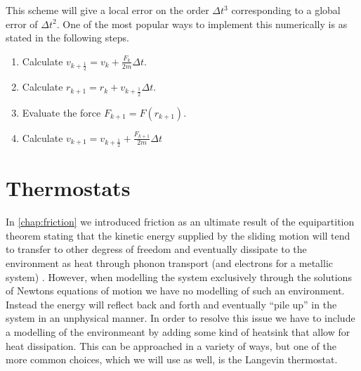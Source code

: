This scheme will give a local error on the order $\Delta t^3$ corresponding to a
global error of $\Delta t^2$. One of the most popular ways to implement this
numerically is as stated in the following steps.
\begin{enumerate}
  \centering
  \item Calculate $v_{k+\frac{1}{2}} = v_k + \frac{F_k}{2m} \Delta t$.
  \item Calculate $r_{k+1} = r_k + v_{k+\frac{1}{2}} \Delta t$.
  \item Evaluate the force $F_{k+1} = F(r_{k+1})$.
  \item Calculate $v_{k+1} = v_{k+\frac{1}{2}} + \frac{F_{k+1}}{2m} \Delta t$  
\end{enumerate}


\section{Thermostats}\label{sec:thermostat}
In \cref{chap:friction} we introduced friction as an ultimate result of the equipartition theorem stating that the kinetic energy supplied by the sliding motion will tend to transfer to other degress of freedom and eventually dissipate to the environment as heat through phonon transport (and electrons for a metallic system) \cite{Manini_2016}. However, when modelling the system exclusively through the solutions of Newtons equations of motion we have no modelling of such an environment. Instead the energy will reflect back and forth and eventually ``pile up'' in the system in an unphysical manner. In order to resolve this issue we have to include a modelling of the environmeant by adding some kind of heatsink that allow for heat dissipation. This can be approached in a variety of ways, but one of the more common choices, which we will use as well, is the Langevin thermostat.








